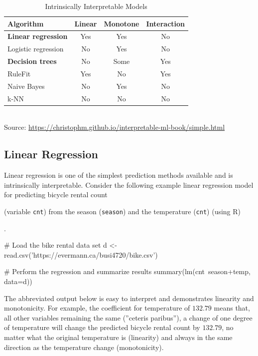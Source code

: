 \begin{table}
\centering
\renewcommand{\arraystretch}{1.25}

\begin{tabular}{lccc} \hline
Algorithm & Linear & Monotone & Interaction \\ \hline
\textbf{Linear regression} & Yes & Yes & No  \\ 
Logistic regression & No & Yes & No  \\
\textbf{Decision trees} & No & Some & Yes  \\
RuleFit & Yes & No & Yes  \\
Naive Bayes & No & Yes & No \\
k-NN & No & No & No  \\ \hline
\end{tabular} \\
\vspace{.5\baselineskip}
\scriptsize Source: \url{https://christophm.github.io/interpretable-ml-book/simple.html}\normalsize

\caption{Intrinsically Interpretable Models}
\label{tab:intrinsicmodels}
\end{table}

\subsection{Linear Regression}

Linear regression is one of the simplest prediction methods available and is intrinsically interpretable. Consider the following example linear regression model for predicting bicycle rental count 
\begin{withcode}
(variable \texttt{cnt}) from the season (\texttt{season}) and the temperature (\texttt{cnt}) (using R)
\end{withcode}
.

\begin{withcode}

\begin{Rcode}
# Load the bike rental data set
d <- read.csv('https://evermann.ca/busi4720/bike.csv')

# Perform the regression and summarize results
summary(lm(cnt~season+temp, data=d))
\end{Rcode}

\end{withcode}

The abbreviated output below is easy to interpret and demonstrates linearity and  monotonicity. For example, the coefficient for temperature of $132.79$ means that, all other variables remaining the same (''ceteris paribus''), a change of one degree of temperature will change the predicted bicycle rental count by $132.79$, no matter what the original temperature is (linearity) and always in the same direction as the temperature change (monotonicity). 

